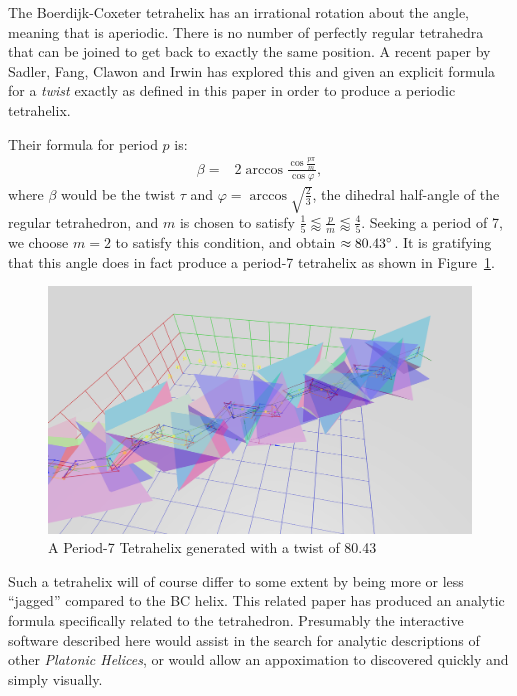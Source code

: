 \documentclass[mathematics,article,submit,pdftex,moreauthors]{Definitions/mdpi}
\begin{document}
The Boerdijk-Coxeter tetrahelix has an irrational rotation about the angle,
meaning that is aperiodic.
There is no number of perfectly regular tetrahedra that can be joined to get back to exactly
the same position.
A recent paper by Sadler, Fang, Clawon and Irwin \cite{sadler2019periodic} has explored this
and given an explicit formula for a {\em twist} exactly as defined in this
paper in order to produce a periodic tetrahelix.

Their formula for period $p$ is:
\begin{align}
  \beta =& 2 \arccos{\frac{\cos{\frac{p\pi}{m}}}{\cos{\varphi}}},
\end{align}
where $\beta$ would be the twist $\tau$ and $\varphi = \arccos{\sqrt{\frac{2}{3}}}$,
the dihedral half-angle of the regular tetrahedron, and $m$ is chosen to
satisfy $\frac{1}{5} \lessapprox \frac{p}{m} \lessapprox \frac{4}{5}$.
Seeking a period of 7, we choose $m = 2$ to satisfy this condition, and
obtain $\approx 80.43 \degree$. It is gratifying that this angle does
in fact produce a period-7 tetrahelix as shown in Figure~\ref{fig:periodseven}.

\begin{figure}
  \centering
  \captionsetup{justification=centering}
     \includegraphics[width=10 cm]{figures/Period7Tetrahelix.png}
     \caption{ A Period-7 Tetrahelix generated with a twist of 80.43\degree}
  \label{fig:periodseven}
\end{figure}
\unskip


Such a tetrahelix will
of course differ to some extent by being more or less ``jagged'' compared to the
BC helix. This related paper \cite{sadler2019periodic} has produced an analytic
formula specifically related to the tetrahedron. Presumably the interactive
software described here would assist in the search for analytic descriptions
of other {\em Platonic Helices}, or would allow an appoximation
to discovered quickly and simply visually.
\end{document}
